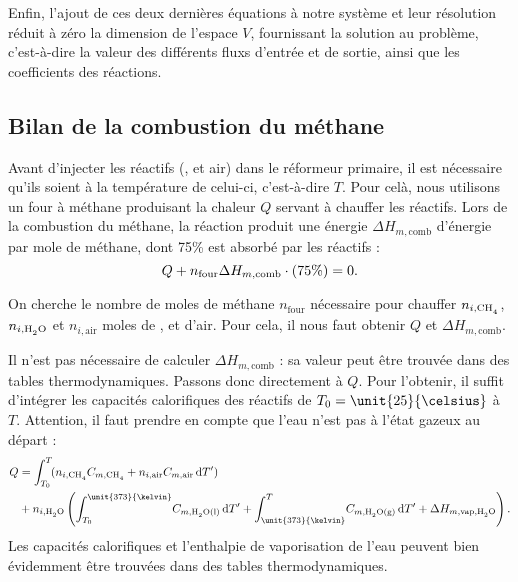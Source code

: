 Enfin, l'ajout de ces deux dernières équations à notre système et leur résolution\footnotemark{} réduit à zéro la dimension de l'espace $V$, fournissant la solution au problème, c'est-à-dire la valeur des différents fluxs d'entrée et de sortie, ainsi que les coefficients des réactions.

\subsection{Bilan de la combustion du méthane}

Avant d'injecter les réactifs (,  et air) dans le réformeur primaire, il est nécessaire qu'ils soient à la température de celui-ci, c'est-à-dire $T$. Pour celà, nous utilisons un four à méthane produisant la chaleur $Q$ servant à chauffer les réactifs. Lors de la combustion du méthane, la réaction produit une énergie $\Delta H_{m,\text{comb}}$ d'énergie par mole de méthane, dont 75\% est absorbé par les réactifs :
\[
    Q + n_\text{four} \Delta H_{m,\text{comb}} \cdot (75\%) = 0
    \text.
\]

On cherche le nombre de moles de méthane $n_\text{four}$ nécessaire pour chauffer $n_{i,\ce{CH4}}$, $n_{i,\ce{H2O}}$ et $n_{i,\text{air}}$ moles de ,  et d'air. Pour cela, il nous faut obtenir $Q$ et $\Delta H_{m,\text{comb}}$.

Il n'est pas nécessaire de calculer $\Delta H_{m,\text{comb}}$ : sa valeur peut être trouvée dans des tables thermodynamiques. Passons donc directement à $Q$. Pour l'obtenir, il suffit d'intégrer les capacités calorifiques des réactifs de $T_0 = \unit{25}{\celsius}$ à $T$. Attention, il faut prendre en compte que l'eau n'est pas à l'état gazeux au départ :
\begin{align*}
    Q &= \int_{T_0}^T\! (n_{i,\ce{CH4}} C_{m,\ce{CH4}} + n_{i,\text{air}} C_{m,\text{air}} \,\diff{T'}) \\
      &+ n_{i,\ce{H2O}} \left( \int_{T_0}^{\unit{373}{\kelvin}}\! C_{m,\ce{H2O(l)}} \,\diff{T'}
       + \int_{\unit{373}{\kelvin}}^T\! C_{m,\ce{H2O(g)}} \,\diff{T'}
       + \Delta H_{m,\text{vap},\ce{H2O}} \right)
    \text.
\end{align*}
Les capacités calorifiques et l'enthalpie de vaporisation de l'eau peuvent bien évidemment être trouvées dans des tables thermodynamiques.

